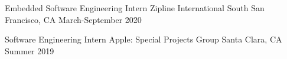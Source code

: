 

\begin{cventries}

  
  \cventry
    {Embedded Software Engineering Intern} %
    {Zipline International} %
    {South San Francisco, CA} %
    {March-September 2020} %
    {
      \begin{cvitems} %
      \end{cvitems}
    }

  \cventry
    {Software Engineering Intern} %
    {Apple: Special Projects Group} %
    {Santa Clara, CA} %
    {Summer 2019} %
    {
      \begin{cvitems} %
      \end{cvitems}
    }

  



\end{cventries}
